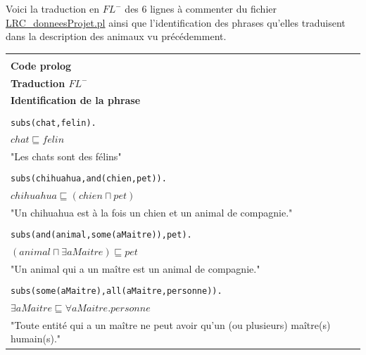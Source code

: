 \documentclass[a4paper,12pt]{report}
\begin{document}
\begin{tcolorbox}[colback=gray!10, colframe=blue!30, coltitle=black, title=Réponse à l'exercice 1 - 1/1]

    Voici la traduction en \(FL^-\) des 6 lignes à commenter du fichier \href{./LRC\_donneesProjet.pl}{LRC\_donneesProjet.pl} ainsi que l'identification
        des phrases qu'elles traduisent dans la description des animaux vu précédemment.

    \begin{table}[H]
        \centering
        \setlength{\tabcolsep}{10pt}
        \begin{tabularx}{\textwidth}{|Y|}

            \hline \\[-0.4cm]
            \textbf{Code prolog} \\[0.3cm]
            \textbf{Traduction \(FL^-\)} \\[0.3cm]
            \textbf{Identification de la phrase} \\[0.1cm]
            \hline

            \hline \\[-0.4cm]
            \texttt{subs(chat,felin).} \\[0.3cm]
            \(chat \sqsubseteq felin\) \\[0.3cm]
            "Les chats sont des félins" \\[0.1cm]
            \hline

            \hline \\[-0.4cm]
            \texttt{subs(chihuahua,and(chien,pet)).} \\[0.3cm]
            \(chihuahua \sqsubseteq (chien \sqcap pet) \) \\[0.3cm]
            "Un chihuahua est à la fois un chien et un animal de compagnie." \\[0.1cm]
            \hline

            \hline \\[-0.4cm]
            \texttt{subs(and(animal,some(aMaitre)),pet).} \\[0.3cm]
            \((animal \sqcap \exists aMaitre) \sqsubseteq pet\) \\[0.3cm]
            "Un animal qui a un maître est un animal de compagnie." \\[0.1cm]
            \hline

            \hline \\[-0.4cm]
            \texttt{subs(some(aMaitre),all(aMaitre,personne)).} \\[0.3cm]
            \(\exists aMaitre \sqsubseteq \forall aMaitre.personne\) \\[0.3cm]
            "Toute entité qui a un maître ne peut avoir qu'un (ou plusieurs) maître(s) humain(s)." \\[0.1cm]
            \hline


\end{tabularx}
\end{table}
\end{tcolorbox}
\end{document}
